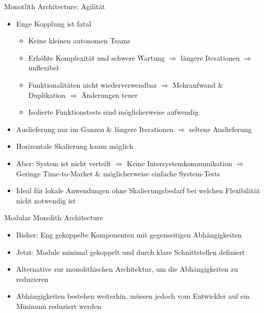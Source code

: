 \begin{frame}{Monotlith Architecture: Agilität}
    \begin{itemize}
        \item Enge Kopplung ist fatal
        \begin{itemize}
            \item Keine kleinen autonomen Teams
            \item Erhöhte Komplexität und schwere Wartung $\Rightarrow$ längere Iterationen $\Rightarrow$ unflexibel
            \item Funktionalitäten nicht wiederverwendbar $\Rightarrow$ Mehraufwand \& Duplikation $\Rightarrow$ Änderungen teuer
            \item Isolierte Funktionstests sind möglicherweise aufwendig
        \end{itemize}
        \item Auslieferung nur im Ganzen \& längere Iterationen $\Rightarrow$ seltene Auslieferung
        \item Horizontale Skalierung kaum möglich
        \item Aber: System ist nicht verteilt $\Rightarrow$ Keine Intersystemkommunikation $\Rightarrow$ Geringe Time-to-Market \& möglicherweise einfache System-Tests
        \item Ideal für lokale Anwendungen ohne Skalierungsbedarf bei welchen Flexibilität nicht notwendig ist
    \end{itemize}
\end{frame}


\begin{frame}{Modular Monolith Architecture}
    \begin{itemize}
       \item Bisher: Eng gekoppelte Komponenten mit gegenseitigen Abhängigkeiten
       \item Jetzt: Module minimal gekoppelt und durch klare Schnittstellen definiert
       \item Alternative zur monolithischen Architektur, um die Abhängigkeiten zu reduzieren
       \item Abhängigkeiten bestehen weiterhin, müssen jedoch vom Entwickler auf ein Minimum reduziert werden
     \end{itemize}
\end{frame}

